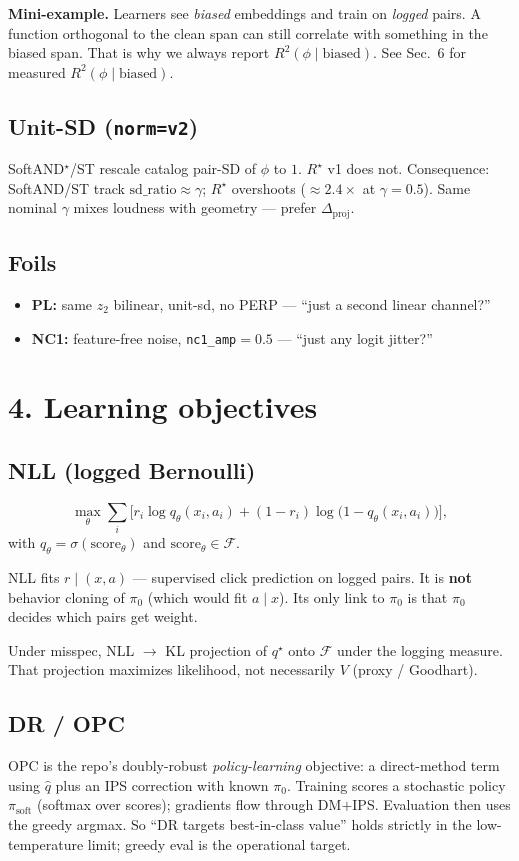\documentclass[11pt]{article}
\newcommand{\phonesection}[1]{\Needspace{8\baselineskip}\section*{#1}}
\newcommand{\phonesub}[1]{\Needspace{6\baselineskip}\subsection*{#1}}
\newcommand{\Rstar}{R^{\star}}
\newcommand{\Dproj}{\Delta_{\mathrm{proj}}}
\newcommand{\miniex}[1]{\par{\footnotesize\color{black!70}\textbf{Mini-example.} #1\par}}
\begin{document}
\miniex{Learners see \emph{biased}
embeddings and train on \emph{logged}
pairs.  A function orthogonal to the clean
span can still correlate with something in
the biased span.  That is why we always
report $R^{2}(\phi\mid\mathrm{biased})$.
See Sec.~6 for measured
$R^{2}(\phi\mid\mathrm{biased})$.}

\phonesub{Unit-SD (\texttt{norm=v2})}
SoftAND$^{\star}$/ST rescale catalog pair-SD
of $\phi$ to $1$.  $\Rstar$ v1 does not.
Consequence: SoftAND/ST track
$\mathrm{sd\_ratio}\approx\gamma$; $\Rstar$
overshoots ($\approx 2.4\times$ at
$\gamma{=}0.5$).  Same nominal $\gamma$ mixes
loudness with geometry --- prefer $\Dproj$.

\phonesub{Foils}
\begin{itemize}
  \item \textbf{PL:} same $z_{2}$ bilinear,
        unit-sd, no PERP --- ``just a second
        linear channel?''
  \item \textbf{NC1:} feature-free noise,
        \texttt{nc1\_amp}${}=0.5$ --- ``just
        any logit jitter?''
\end{itemize}

\phonesection{4. Learning objectives}

\phonesub{NLL (logged Bernoulli)}
\begin{equation*}
\max_{\theta}
\sum_{i}\Big[
  r_{i}\log q_{\theta}(x_{i},a_{i})
  +(1-r_{i})\log\big(1-q_{\theta}(x_{i},a_{i})\big)
\Big],
\end{equation*}
with $q_{\theta}=\sigma(\mathrm{score}_{\theta})$
and $\mathrm{score}_{\theta}\in\mathcal{F}$.

NLL fits $r\mid(x,a)$ --- supervised click
prediction on logged pairs.  It is
\textbf{not} behavior cloning of $\pi_{0}$
(which would fit $a\mid x$).  Its only link
to $\pi_{0}$ is that $\pi_{0}$ decides which
pairs get weight.

Under misspec, NLL $\to$ KL projection of
$q^{\star}$ onto $\mathcal{F}$ under the
logging measure.  That projection maximizes
likelihood, not necessarily $V$
(proxy / Goodhart).

\phonesub{DR / OPC}
OPC is the repo's doubly-robust
\emph{policy-learning} objective: a
direct-method term using $\hat{q}$ plus an
IPS correction with known $\pi_{0}$.
Training scores a stochastic policy
$\pi_{\mathrm{soft}}$ (softmax over scores);
gradients flow through DM$+$IPS.
Evaluation then uses the greedy argmax.
So ``DR targets best-in-class value'' holds
strictly in the low-temperature limit;
greedy eval is the operational target.
\end{document}
